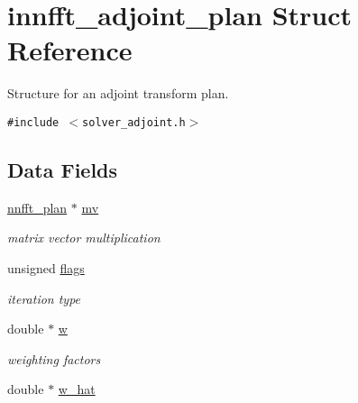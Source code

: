 \hypertarget{structinnfft__adjoint__plan}{
\section{innfft\_\-adjoint\_\-plan Struct Reference}
\label{structinnfft__adjoint__plan}
}
Structure for an adjoint transform plan.  


{\tt \#include $<$solver\_\-adjoint.h$>$}

\subsection*{Data Fields}
\begin{CompactItemize}
\item 
\hypertarget{structinnfft__adjoint__plan_bb0996d6ed2cd627dc28fb7f5c18007a}{
\hyperlink{structnnfft__plan}{nnfft\_\-plan} $\ast$ \hyperlink{structinnfft__adjoint__plan_bb0996d6ed2cd627dc28fb7f5c18007a}{mv}}
\label{structinnfft__adjoint__plan_bb0996d6ed2cd627dc28fb7f5c18007a}

\begin{CompactList}\small\item\em matrix vector multiplication \item\end{CompactList}\item 
\hypertarget{structinnfft__adjoint__plan_0d51c3ece7512b04408b5a2b94ee4a05}{
unsigned \hyperlink{structinnfft__adjoint__plan_0d51c3ece7512b04408b5a2b94ee4a05}{flags}}
\label{structinnfft__adjoint__plan_0d51c3ece7512b04408b5a2b94ee4a05}

\begin{CompactList}\small\item\em iteration type \item\end{CompactList}\item 
\hypertarget{structinnfft__adjoint__plan_20565dbd14d036eb348ca0276a4f411c}{
double $\ast$ \hyperlink{structinnfft__adjoint__plan_20565dbd14d036eb348ca0276a4f411c}{w}}
\label{structinnfft__adjoint__plan_20565dbd14d036eb348ca0276a4f411c}

\begin{CompactList}\small\item\em weighting factors \item\end{CompactList}\item 
\hypertarget{structinnfft__adjoint__plan_0545064b15a22a5a3ae285e6aded5f80}{
double $\ast$ \hyperlink{structinnfft__adjoint__plan_0545064b15a22a5a3ae285e6aded5f80}{w\_\-hat}}
\label{structinnfft__adjoint__plan_0545064b15a22a5a3ae285e6aded5f80}


\end{CompactItemize}
